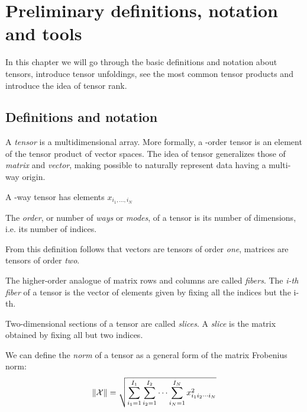 \chapter{Preliminary definitions, notation and tools}

In this chapter we will go through the basic definitions and notation about tensors, introduce tensor unfoldings, see the most common tensor products and introduce the idea of tensor rank.

\section{Definitions and notation}

A \emph{tensor} is a multidimensional array. More formally, a \N-order tensor is an element of the tensor product of \N vector spaces. The idea of tensor generalizes those of \emph{matrix} and \emph{vector}, making possible to naturally represent data having a multi-way origin.

A \N-way tensor \X has elements $x_{i_1,\dots,i_N}$

\begin{Def}
  The \emph{order}, or number of \emph{ways} or \emph{modes}, of a tensor is its number of dimensions, i.e. its number of indices.
\end{Def}

From this definition follows that vectors are tensors of order \emph{one}, matrices are tensors of order \emph{two}.

\begin{Def}
  The higher-order analogue of matrix rows and columns are called \emph{fibers}. The \emph{i-th fiber} of a tensor \X is the vector of elements given by fixing all the indices but the i-th.
\end{Def}

\begin{Def}
  Two-dimensional sections of a tensor are called \emph{slices}. A \emph{slice} is the matrix obtained by fixing all but two indices.
\end{Def}

\begin{Def}
  We can define the \emph{norm} of a tensor as a general form of the matrix Frobenius norm:
  \[
  \|\mathcal{X}\| = \sqrt{\sum_{i_1 = 1}^{I_1}\sum_{i_2 = 1}^{I_2}\cdots\sum_{i_N = 1}^{I_N}x^2_{i_1 i_2 \cdots i_N}}
  \]
\end{Def}


